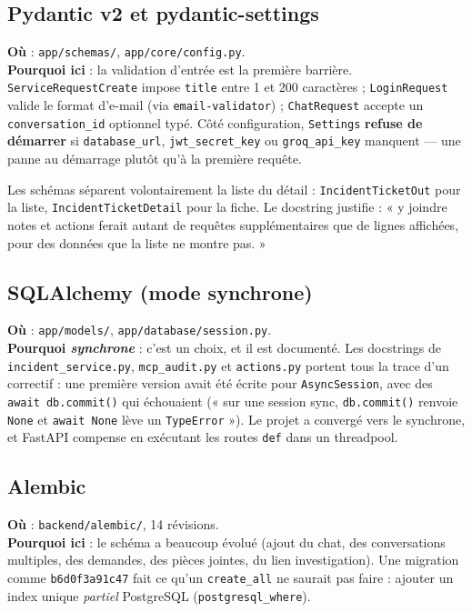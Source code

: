 \documentclass[11pt,a4paper]{report}
\newcommand{\file}[1]{\texttt{\small #1}}
\newcommand{\fn}[1]{\texttt{\small\textcolor{oasisviolet}{#1}}}
\newcommand{\cls}[1]{\texttt{\small\textcolor{oasisblue}{#1}}}
\begin{document}
\subsection{Pydantic v2 et pydantic-settings}
\textbf{Où} : \file{app/schemas/}, \file{app/core/config.py}.\\
\textbf{Pourquoi ici} : la validation d'entrée est la première barrière.
\cls{ServiceRequestCreate} impose \texttt{title} entre 1 et 200 caractères ;
\cls{LoginRequest} valide le format d'e-mail (via \texttt{email-validator}) ;
\cls{ChatRequest} accepte un \texttt{conversation\_id} optionnel typé.
Côté configuration, \cls{Settings} \textbf{refuse de démarrer} si
\texttt{database\_url}, \texttt{jwt\_secret\_key} ou \texttt{groq\_api\_key}
manquent --- une panne au démarrage plutôt qu'à la première requête.

\begin{infobox}
Les schémas séparent volontairement la liste du détail : \cls{IncidentTicketOut}
pour la liste, \cls{IncidentTicketDetail} pour la fiche. Le docstring justifie :
« y joindre notes et actions ferait autant de requêtes supplémentaires que de
lignes affichées, pour des données que la liste ne montre pas. »
\end{infobox}

\subsection{SQLAlchemy (mode synchrone)}
\textbf{Où} : \file{app/models/}, \file{app/database/session.py}.\\
\textbf{Pourquoi \emph{synchrone}} : c'est un choix, et il est documenté. Les
docstrings de \file{incident\_service.py}, \file{mcp\_audit.py} et
\file{actions.py} portent tous la trace d'un correctif : une première version
avait été écrite pour \texttt{AsyncSession}, avec des \texttt{await
db.commit()} qui échouaient (« sur une session sync, \fn{db.commit()} renvoie
\texttt{None} et \texttt{await None} lève un \texttt{TypeError} »). Le projet a
convergé vers le synchrone, et FastAPI compense en exécutant les routes
\texttt{def} dans un threadpool.

\subsection{Alembic}
\textbf{Où} : \file{backend/alembic/}, 14 révisions.\\
\textbf{Pourquoi ici} : le schéma a beaucoup évolué (ajout du chat, des
conversations multiples, des demandes, des pièces jointes, du lien
investigation). Une migration comme \file{b6d0f3a91c47} fait ce qu'un
\texttt{create\_all} ne saurait pas faire : ajouter un index unique
\emph{partiel} PostgreSQL (\texttt{postgresql\_where}).
\end{document}
